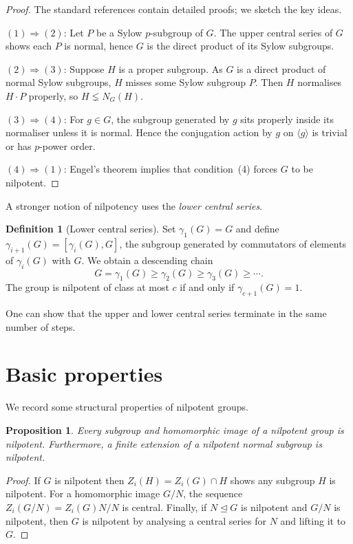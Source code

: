 \documentclass{article}
\newtheorem{proposition}[theorem]{Proposition}
\theoremstyle{definition}
\newtheorem{definition}[theorem]{Definition}
\begin{document}
\begin{proof}
The standard references contain detailed proofs; we sketch the key ideas.

$(1)\Rightarrow(2)$:  Let $P$ be a Sylow $p$-subgroup of $G$.  The upper central series of $G$ shows each $P$ is normal, hence $G$ is the direct product of its Sylow subgroups.

$(2)\Rightarrow(3)$:  Suppose $H$ is a proper subgroup.  As $G$ is a direct product of normal Sylow subgroups, $H$ misses some Sylow subgroup $P$.  Then $H$ normalises $H\cdot P$ properly, so $H\lneq N_G(H)$.

$(3)\Rightarrow(4)$:  For $g\in G$, the subgroup generated by $g$ sits properly inside its normaliser unless it is normal.  Hence the conjugation action by $g$ on $\langle g\rangle$ is trivial or has $p$-power order.

$(4)\Rightarrow(1)$:  Engel's theorem implies that condition~(4) forces $G$ to be nilpotent.
\end{proof}

A stronger notion of nilpotency uses the \emph{lower central series}.

\begin{definition}[Lower central series]
Set $\gamma_1(G)=G$ and define $\gamma_{i+1}(G)=[\gamma_i(G),G]$, the subgroup generated by commutators of elements of $\gamma_i(G)$ with $G$.  
We obtain a descending chain
\[
G=\gamma_1(G)\ge \gamma_2(G)\ge \gamma_3(G) \ge \cdots.
\]
The group is nilpotent of class at most $c$ if and only if $\gamma_{c+1}(G)=1$.
\end{definition}

One can show that the upper and lower central series terminate in the same number of steps.

\section{Basic properties}

We record some structural properties of nilpotent groups.

\begin{proposition}
Every subgroup and homomorphic image of a nilpotent group is nilpotent.  Furthermore, a finite extension of a nilpotent normal subgroup is nilpotent.
\end{proposition}
\begin{proof}
If $G$ is nilpotent then $Z_i(H)=Z_i(G)\cap H$ shows any subgroup $H$ is nilpotent.  
For a homomorphic image $G/N$, the sequence $Z_i(G/N)=Z_i(G)N/N$ is central.  
Finally, if $N\trianglelefteq G$ is nilpotent and $G/N$ is nilpotent, then $G$ is nilpotent by analysing a central series for $N$ and lifting it to $G$.
\end{proof}
\end{document}
